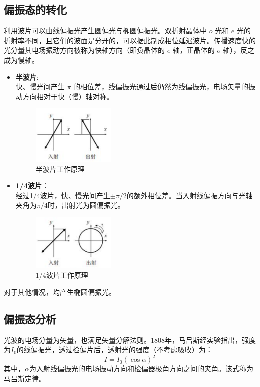 \documentclass{article}
\begin{document}
\subsection{偏振态的转化}
\hspace*{2em}利用波片可以由线偏振光产生圆偏光与椭圆偏振光。双折射晶体中 \(o\) 光和 \(e\) 光的折射率不同，且它们的波面是分开的，可以据此制成相位延迟波片。传播速度快的光分量其电场振动方向被称为快轴方向（即负晶体的 \(e\) 轴，正晶体的 \(o\) 轴），反之成为慢轴。
\begin{itemize}
    \item \textbf{半波片}:\\
    \hspace*{2em}快、慢光间产生 \(\pi\) 的相位差，线偏振光通过后仍然为线偏振光，电场矢量的振动方向相对于快（慢）轴对称。
    \begin{figure}[ht]
        \centering
        \includegraphics[width=4cm]{3.1.png}
        \caption{半波片工作原理}
    \end{figure}
    \item \textbf{1/4波片}：\\
    \hspace*{2em}经过1/4波片，快、慢光间产生\(\pm\pi/2\)的额外相位差。当入射线偏振方向与光轴夹角为\(\pi/4\)时，出射光为圆偏振光。
    \begin{figure}[ht]
        \centering
        \includegraphics[width=4cm]{3.2.png}
        \caption{1/4波片工作原理}
    \end{figure}
\end{itemize}
对于其他情况，均产生椭圆偏振光。
\subsection{偏振态分析}
\hspace*{2em}光波的电场分量为矢量，也满足矢量分解法则。1808年，马吕斯经实验指出，强度为\(I_0\)的线偏振光，透过检偏片后，透射光的强度（不考虑吸收）为：
\[
I = I_0 (\cos\alpha)^2
\]
\hspace*{2em}其中，\(\alpha\)为入射线偏振光的电场振动方向和检偏器极角方向之间的夹角。该式称为马吕斯定律。
\end{document}
